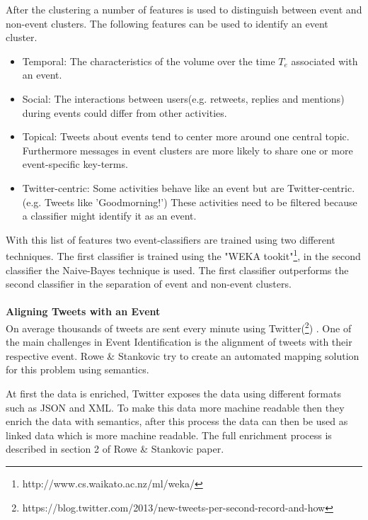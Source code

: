 \documentclass{article}
\begin{document}
After the clustering a number of features is used to distinguish between event and non-event clusters. The following features can be used to identify an event cluster. \cite{eventident} 
\begin{itemize}
  \item Temporal: The characteristics of the volume over the time $T_e$ associated with an event. 
  \item Social: The interactions between users(e.g. retweets, replies and mentions) during events could differ from other activities. 
  \item Topical: Tweets about events tend to center more around one central topic. Furthermore messages in event clusters are more likely to share one or more event-specific key-terms.  
  \item Twitter-centric: Some activities behave like an event but are Twitter-centric.(e.g. Tweets like 'Goodmorning!') These activities need to be filtered because a classifier might identify it as an event. 
\end{itemize}

With this list of features two event-classifiers are trained using two different techniques. The first classifier is trained using the "WEKA tookit"\footnote{http://www.cs.waikato.ac.nz/ml/weka/}, in the second classifier the  Naive-Bayes technique is used. The first classifier outperforms the second classifier in the separation of event and non-event clusters. \cite{eventident}
\\\\
\textbf{Aligning Tweets with an Event} \\
On average thousands of tweets are sent every minute using Twitter(\footnote{https://blog.twitter.com/2013/new-tweets-per-second-record-and-how}) . One of the main challenges in Event Identification is the alignment of tweets with their respective event. Rowe \& Stankovic try to create an automated mapping solution for this problem using semantics. \cite{eventalign}


At first the data is enriched, Twitter exposes the data using different formats such as JSON and XML. To make this data more machine readable then they enrich the data with semantics, after this process the data can then  be used as linked data which is more machine readable. The full enrichment process is described in section 2 of Rowe \& Stankovic paper. \cite{eventalign}
\end{document}
